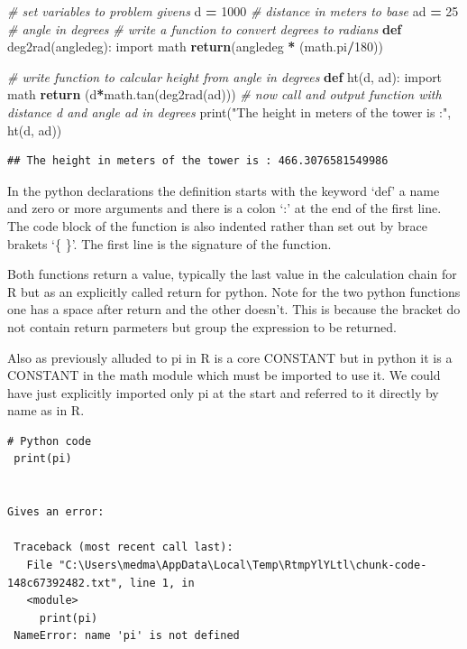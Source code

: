 \documentclass[]{book}
\newenvironment{Shaded}{\begin{snugshade}}{\end{snugshade}}
\newcommand{\KeywordTok}[1]{\textcolor[rgb]{0.13,0.29,0.53}{\textbf{#1}}}
\newcommand{\DecValTok}[1]{\textcolor[rgb]{0.00,0.00,0.81}{#1}}
\newcommand{\StringTok}[1]{\textcolor[rgb]{0.31,0.60,0.02}{#1}}
\newcommand{\ImportTok}[1]{#1}
\newcommand{\CommentTok}[1]{\textcolor[rgb]{0.56,0.35,0.01}{\textit{#1}}}
\newcommand{\ControlFlowTok}[1]{\textcolor[rgb]{0.13,0.29,0.53}{\textbf{#1}}}
\newcommand{\OperatorTok}[1]{\textcolor[rgb]{0.81,0.36,0.00}{\textbf{#1}}}
\newcommand{\BuiltInTok}[1]{#1}
\newcommand{\NormalTok}[1]{#1}
\theoremstyle{definition}
\theoremstyle{definition}
\theoremstyle{definition}
\theoremstyle{remark}
\begin{document}
\begin{Shaded}
\begin{Highlighting}[]
\CommentTok{# set variables to problem givens}
\NormalTok{d }\OperatorTok{=} \DecValTok{1000}    \CommentTok{# distance in meters to base}
\NormalTok{ad }\OperatorTok{=} \DecValTok{25}     \CommentTok{# angle in degrees}
\CommentTok{# write a function to convert degrees to radians}
\KeywordTok{def}\NormalTok{ deg2rad(angledeg):}
    \ImportTok{import}\NormalTok{ math}
    \ControlFlowTok{return}\NormalTok{(angledeg }\OperatorTok{*}\NormalTok{ (math.pi}\OperatorTok{/}\DecValTok{180}\NormalTok{))}
    
\CommentTok{# write function to calcular height from angle in degrees}
\KeywordTok{def}\NormalTok{ ht(d, ad):}
  \ImportTok{import}\NormalTok{ math}
  \ControlFlowTok{return}\NormalTok{ (d}\OperatorTok{*}\NormalTok{math.tan(deg2rad(ad)))}
\CommentTok{# now call and output function with distance d and angle ad in degrees}
\BuiltInTok{print}\NormalTok{(}\StringTok{"The height in meters of the tower is :"}\NormalTok{, ht(d, ad))}
\end{Highlighting}
\end{Shaded}

\begin{verbatim}
## The height in meters of the tower is : 466.3076581549986
\end{verbatim}

In the python declarations the definition starts with the keyword `def'
a name and zero or more arguments and there is a colon `:' at the end of
the first line. The code block of the function is also indented rather
than set out by brace brakets `\{ \}'. The first line is the signature
of the function.

Both functions return a value, typically the last value in the
calculation chain for R but as an explicitly called return for python.
Note for the two python functions one has a space after return and the
other doesn't. This is because the bracket do not contain return
parmeters but group the expression to be returned.

Also as previously alluded to pi in R is a core CONSTANT but in python
it is a CONSTANT in the math module which must be imported to use it. We
could have just explicitly imported only pi at the start and referred to
it directly by name as in R.

\begin{verbatim}
# Python code
 print(pi)


Gives an error:

 Traceback (most recent call last):
   File "C:\Users\medma\AppData\Local\Temp\RtmpYlYLtl\chunk-code-148c67392482.txt", line 1, in
   <module>
     print(pi)
 NameError: name 'pi' is not defined
\end{verbatim}
\end{document}
